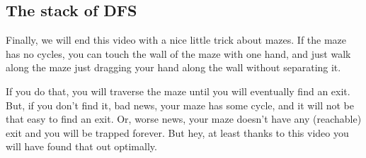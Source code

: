 \documentclass[12pt]{article}
\begin{document}
\subsection{The stack of DFS}

Finally, we will end this video with a nice little trick about mazes. If
the maze has no cycles, you can touch the wall of the maze with one hand,
and just walk along the maze just dragging your hand along the wall without
separating it.

If you do that, you will traverse the maze until you will eventually find
an exit. But, if you don't find it, bad news, your maze has some cycle, and it
will not be that easy to find an exit. Or, worse news, your maze doesn't have any (reachable) exit
and you will be trapped forever. But hey, at least thanks to this video you will have found that
out optimally.
\end{document}
